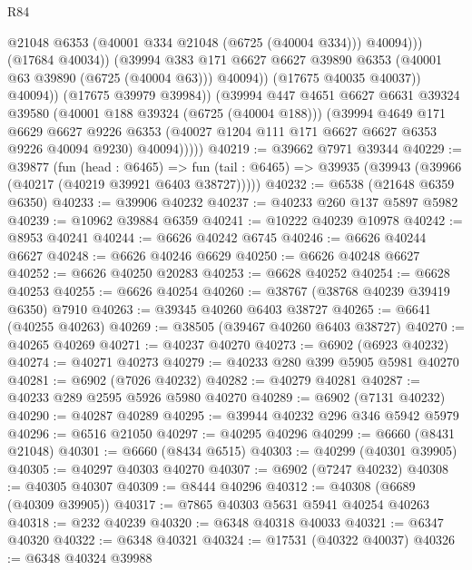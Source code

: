 \begin{lexlean}{R84}
\begin{coremodule}
                            @21048
                            @6353
                            (@40001 @334 @21048 (@6725 (@40004 @334)))
                            @40094)))
                      (@17684 @40034))
                    (@39994
                      @383
                      @171
                      @6627
                      @6627
                      @39890
                      @6353
                      (@40001 @63 @39890 (@6725 (@40004 @63)))
                      @40094))
                  (@17675 @40035 @40037))
                @40094))
            (@17675 @39979 @39984))
          (@39994
            @447
            @4651
            @6627
            @6631
            @39324
            @39580
            (@40001 @188 @39324 (@6725 (@40004 @188)))
            (@39994
              @4649
              @171
              @6629
              @6627
              @9226
              @6353
              (@40027 @1204 @111 @171 @6627 @6627 @6353 @9226 @40094 @9230)
              @40094)))))
@40219 := @39662 @7971 @39344
@40229 := @39877
    (fun (head : @6465) =>
    fun (tail : @6465) => @39935 (@39943 (@39966 (@40217 (@40219 @39921 @6403 @38727)))))
@40232 := @6538 (@21648 @6359 @6350)
@40233 := @39906 @40232
@40237 := @40233 @260 @137 @5897 @5982
@40239 := @10962 @39884 @6359
@40241 := @10222 @40239 @10978
@40242 := @8953 @40241
@40244 := @6626 @40242 @6745
@40246 := @6626 @40244 @6627
@40248 := @6626 @40246 @6629
@40250 := @6626 @40248 @6627
@40252 := @6626 @40250 @20283
@40253 := @6628 @40252
@40254 := @6628 @40253
@40255 := @6626 @40254
@40260 := @38767 (@38768 @40239 @39419 @6350) @7910
@40263 := @39345 @40260 @6403 @38727
@40265 := @6641 (@40255 @40263)
@40269 := @38505 (@39467 @40260 @6403 @38727)
@40270 := @40265 @40269
@40271 := @40237 @40270
@40273 := @6902 (@6923 @40232)
@40274 := @40271 @40273
@40279 := @40233 @280 @399 @5905 @5981 @40270
@40281 := @6902 (@7026 @40232)
@40282 := @40279 @40281
@40287 := @40233 @289 @2595 @5926 @5980 @40270
@40289 := @6902 (@7131 @40232)
@40290 := @40287 @40289
@40295 := @39944 @40232 @296 @346 @5942 @5979
@40296 := @6516 @21050
@40297 := @40295 @40296
@40299 := @6660 (@8431 @21048)
@40301 := @6660 (@8434 @6515)
@40303 := @40299 (@40301 @39905)
@40305 := @40297 @40303 @40270
@40307 := @6902 (@7247 @40232)
@40308 := @40305 @40307
@40309 := @8444 @40296
@40312 := @40308 (@6689 (@40309 @39905))
@40317 := @7865 @40303 @5631 @5941 @40254 @40263
@40318 := @232 @40239
@40320 := @6348 @40318 @40033
@40321 := @6347 @40320
@40322 := @6348 @40321
@40324 := @17531 (@40322 @40037)
@40326 := @6348 @40324 @39988

\end{coremodule}
\end{lexlean}
